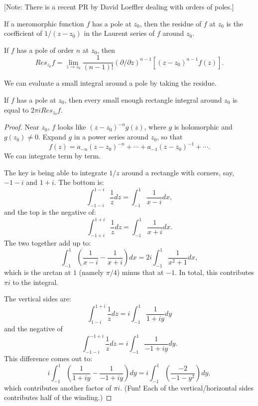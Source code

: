 [Note: There is a recent PR by David Loeffler dealing with orders of poles.]



If a meromorphic function $f$ has a pole at $z_0$, then the residue of $f$ at $z_0$ is the coefficient of $1/(z-z_0)$ in the Laurent series of $f$ around $z_0$.
\begin{definition}\label{Residue}
If $f$ has a pole of order $n$ at $z_0$, then
$$
Res_{z_0} f = \lim_{z\to z_0}\frac1{(n-1)!}(\partial/\partial z)^{n-1}[(z-z_0)^{n-1}f(z)].
$$
\end{definition}



We can evaluate a small integral around a pole by taking the residue.
\begin{theorem}\label{ResidueTheoremOnRectangle}
If $f$ has a pole at $z_0$, then every small enough rectangle integral around $z_0$ is equal to $2\pi i Res_{z_0} f$.
\end{theorem}



\begin{proof}
Near $z_0$, $f$ looks like $(z-z_0)^{-n} g(z)$, where $g$ is holomorphic and $g(z_0) \neq 0$.
Expand $g$ in a power series around $z_0$, so that
$$
f(z) = a_{-n}(z-z_0)^{-n} + \cdots + a_{-1}(z-z_0)^{-1} + \cdots.
$$
We can integrate term by term.

The key is being able to integrate $1/z$ around a rectangle with corners, say, $-1-i$ and $1+i$. The bottom is:
$$
\int_{-1-i}^{1-i} \frac1z dz
=
\int_{-1}^1 \frac1{x-i} dx,
$$
and the top is the negative of:
$$
\int_{-1+i}^{1+i} \frac1z dz
=
\int_{-1}^1 \frac1{x+i} dx.
$$
The two together add up to:
$$
\int_{-1}^1
\left(\frac1{x-i}-\frac1{x+i} \right)dx
=
2i\int_{-1}^1
\frac{1}{x^2+1}dx,
$$
which is the arctan at $1$ (namely $\pi/4$) minus that at $-1$. In total, this contributes $\pi i$ to the integral.

The vertical sides are:
$$
\int_{1-i}^{1+i} \frac1z dz
=
i\int_{-1}^1 \frac1{1+iy} dy
$$
and the negative of
$$
\int_{-1-i}^{-1+i} \frac1z dz
=
i\int_{-1}^1 \frac1{-1+iy} dy.
$$
This difference comes out to:
$$
i\int_{-1}^1 \left(\frac1{1+iy}-\frac1{-1+iy}\right) dy
=
i\int_{-1}^1 \left(\frac{-2}{-1-y^2}\right) dy,
$$
which contributes another factor of $\pi i$. (Fun! Each of the vertical/horizontal sides contributes half of the winding.)
\end{proof}

